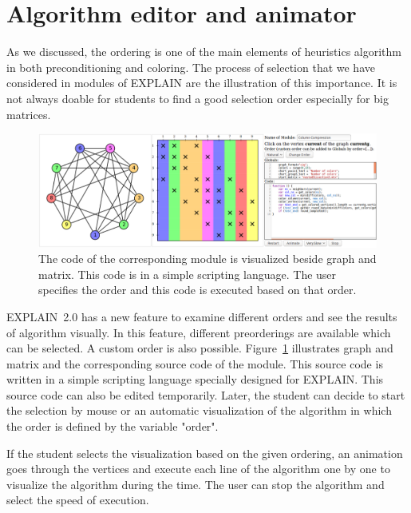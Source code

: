 \documentclass[12pt, twoside,a4paper,toc=bibliography]{scrbook}
\begin{document}
\section{Algorithm editor and animator}
\label{s.alg.edit}
As we discussed, the ordering is one of the main elements of heuristics algorithm
in both preconditioning and coloring. The process of selection that we have
considered in modules of \mbox{EXPLAIN} are the illustration of this importance.
It is not always doable for students to find a good selection order especially for
big matrices.
\begin{figure}
\centering
\includegraphics[width=\textwidth]{custom_module}
\caption{The code of the corresponding module is visualized beside
graph and matrix. This code is in a simple scripting language.
The user specifies the order and this code is executed based on that order.}
\label{f.custom_module}
\end{figure}

\mbox{EXPLAIN 2.0} has a new feature to examine different orders
and see the results of algorithm visually. In this feature, different
preorderings are available which can be selected. A custom order is
also possible. Figure~\ref{f.custom_module} illustrates graph and matrix
and the corresponding source code of the module. This source code
is written in a simple scripting language specially designed for \mbox{EXPLAIN}.
This source code can also be edited temporarily. Later, the student can
decide to start the selection by mouse or an automatic visualization
of the algorithm in which the order is defined by the variable "order".

If the student selects the visualization based on the given ordering,
an animation goes through the vertices and execute each line of the algorithm
one by one to visualize the algorithm during the time.
The user can stop the algorithm and select the speed of execution.
\end{document}
